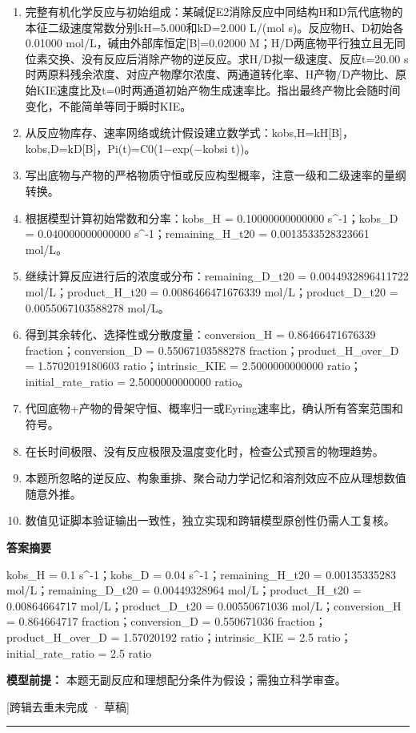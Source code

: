 \documentclass[UTF8,11pt,a4paper]{ctexart}
\begin{document}
\begin{enumerate}
\item 完整有机化学反应与初始组成：某碱促E2消除反应中同结构H和D氘代底物的本征二级速度常数分别kH=5.000和kD=2.000 L/(mol s)。反应物H、D初始各0.01000 mol/L，碱由外部库恒定[B]=0.02000 M；H/D两底物平行独立且无同位素交换、没有反应后消除产物的逆反应。求H/D拟一级速度、反应t=20.00 s时两原料残余浓度、对应产物摩尔浓度、两通道转化率、H产物/D产物比、原始KIE速度比及t=0时两通道初始产物生成速率比。指出最终产物比会随时间变化，不能简单等同于瞬时KIE。
\item 从反应物库存、速率网络或统计假设建立数学式：kobs,H=kH[B]，kobs,D=kD[B]，Pi(t)=C0(1−exp(−kobsi t))。
\item 写出底物与产物的严格物质守恒或反应构型概率，注意一级和二级速率的量纲转换。
\item 根据模型计算初始常数和分率：kobs\_H = 0.10000000000000 s\textasciicircum{}-1；kobs\_D = 0.040000000000000 s\textasciicircum{}-1；remaining\_H\_t20 = 0.0013533528323661 mol/L。
\item 继续计算反应进行后的浓度或分布：remaining\_D\_t20 = 0.0044932896411722 mol/L；product\_H\_t20 = 0.0086466471676339 mol/L；product\_D\_t20 = 0.0055067103588278 mol/L。
\item 得到其余转化、选择性或分散度量：conversion\_H = 0.86466471676339 fraction；conversion\_D = 0.55067103588278 fraction；product\_H\_over\_D = 1.5702019180603 ratio；intrinsic\_KIE = 2.5000000000000 ratio；initial\_rate\_ratio = 2.5000000000000 ratio。
\item 代回底物+产物的骨架守恒、概率归一或Eyring速率比，确认所有答案范围和符号。
\item 在长时间极限、没有反应极限及温度变化时，检查公式预言的物理趋势。
\item 本题所忽略的逆反应、构象重排、聚合动力学记忆和溶剂效应不应从理想数值随意外推。
\item 数值见证脚本验证输出一致性，独立实现和跨辑模型原创性仍需人工复核。
\end{enumerate}
\noindent\textbf{答案摘要}\par
kobs\_H = 0.1 s\textasciicircum{}-1；kobs\_D = 0.04 s\textasciicircum{}-1；remaining\_H\_t20 = 0.00135335283 mol/L；remaining\_D\_t20 = 0.00449328964 mol/L；product\_H\_t20 = 0.00864664717 mol/L；product\_D\_t20 = 0.00550671036 mol/L；conversion\_H = 0.864664717 fraction；conversion\_D = 0.550671036 fraction；product\_H\_over\_D = 1.57020192 ratio；intrinsic\_KIE = 2.5 ratio；initial\_rate\_ratio = 2.5 ratio\par
\noindent\textbf{模型前提：}
本题无副反应和理想配分条件为假设；需独立科学审查。\par
\noindent\textcolor{red!65!black}{[跨辑去重未完成 · 草稿]} \par
\medskip\hrule\medskip
{}
\end{document}
